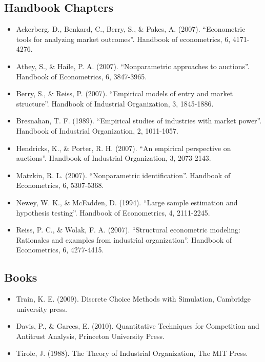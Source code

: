 \documentclass[]{book}
\providecommand{\tightlist}{%
  \setlength{\itemsep}{0pt}\setlength{\parskip}{0pt}}
\theoremstyle{definition}
\theoremstyle{definition}
\theoremstyle{definition}
\theoremstyle{remark}
\begin{document}
\subsection{Handbook Chapters}\label{handbook-chapters}

\begin{itemize}
\tightlist
\item
  Ackerberg, D., Benkard, C., Berry, S., \& Pakes, A. (2007).
  ``Econometric tools for analyzing market outcomes''. Handbook of
  econometrics, 6, 4171-4276.
\item
  Athey, S., \& Haile, P. A. (2007). ``Nonparametric approaches to
  auctions''. Handbook of Econometrics, 6, 3847-3965.
\item
  Berry, S., \& Reiss, P. (2007). ``Empirical models of entry and market
  structure''. Handbook of Industrial Organization, 3, 1845-1886.
\item
  Bresnahan, T. F. (1989). ``Empirical studies of industries with market
  power''. Handbook of Industrial Organization, 2, 1011-1057.
\item
  Hendricks, K., \& Porter, R. H. (2007). ``An empirical perspective on
  auctions''. Handbook of Industrial Organization, 3, 2073-2143.
\item
  Matzkin, R. L. (2007). ``Nonparametric identification''. Handbook of
  Econometrics, 6, 5307-5368.
\item
  Newey, W. K., \& McFadden, D. (1994). ``Large sample estimation and
  hypothesis testing''. Handbook of Econometrics, 4, 2111-2245.
\item
  Reiss, P. C., \& Wolak, F. A. (2007). ``Structural econometric
  modeling: Rationales and examples from industrial organization''.
  Handbook of Econometrics, 6, 4277-4415.
\end{itemize}

\subsection{Books}\label{books}

\begin{itemize}
\tightlist
\item
  Train, K. E. (2009). Discrete Choice Methods with Simulation,
  Cambridge university press.
\item
  Davis, P., \& Garces, E. (2010). Quantitative Techniques for
  Competition and Antitrust Analysis, Princeton University Press.
\item
  Tirole, J. (1988). The Theory of Industrial Organization, The MIT
  Press.
\end{itemize}
\end{document}
